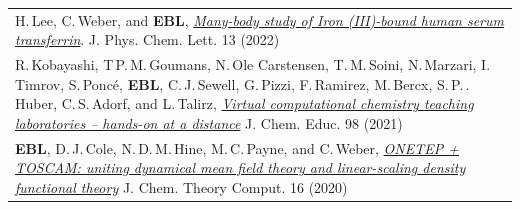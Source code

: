\documentclass[10pt,a4paper,final]{article}
\begin{document}
\begin{tabularx}{\textwidth}{
   X}
   H.\,Lee, C.\,Weber, and \textbf{EBL}, \href{https://doi.org/10.1021/acs.jpclett.2c00680}{\textit{Many-body study of Iron (III)-bound human serum transferrin}}. J. Phys. Chem. Lett. 13 (2022)                                                                                                                                                                                                                                                                                                                                                                                                                                                                                                                                                                      \\ %
   R.\,Kobayashi, T\,P.\,M.\,Goumans, N.\,Ole Carstensen, T.\,M.\,Soini, N.\,Marzari, I.\,Timrov, S.\,Ponc\'e, \textbf{EBL}, C.\,J.\,Sewell, G.\,Pizzi, F.\,Ramirez, M.\,Bercx, S.\,P.\,. Huber, C.\,S.\,Adorf, and L.\,Talirz, \href{https://doi.org/10.1021/acs.jchemed.1c00655}{\textit{Virtual computational chemistry teaching laboratories – hands-on at a distance}} J. Chem. Educ. 98 (2021)                                                                                                                                                                                                                                                                                                                                                                   \\ %
   \textbf{EBL}, D.\,J.\,Cole, N.\,D.\,M.\,Hine, M.\,C.\,Payne, and C.\,Weber, \href{https://doi.org/10.1021/acs.jctc.0c00162}{\textit{ONETEP + TOSCAM: uniting dynamical mean field theory and linear-scaling density functional theory}} J. Chem. Theory Comput. 16 (2020)                                                                                                                                                                                                                                                                                                                                                                                                                                                                                           \\ %

\end{tabularx}
\end{document}
